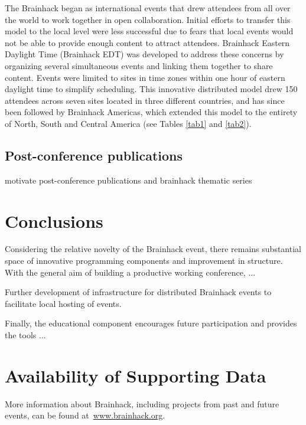 \documentclass[11pt]{bmc_article_s50}
\begin{document}
The Brainhack began as international events that drew attendees from all over the world to work together in open collaboration. Initial efforts to transfer this model to the local level were less successful due to fears that local events would not be able to provide enough content to attract attendees. Brainhack Eastern Daylight Time (Brainhack EDT) was developed to address these concerns by organizing several simultaneous events and linking them together to share content. Events were limited to sites in time zones within one hour of eastern daylight time to simplify scheduling. This innovative distributed model drew 150 attendees across seven sites located in three different countries, and has since been followed by Brainhack Americas, which extended this model to the entirety of North, South and Central America (see Tables \ref{tab1} and \ref{tab2}).

\subsection{Post-conference publications}

motivate post-conference publications and brainhack thematic series


\section{Conclusions}

Considering the relative novelty of the Brainhack event, there remains substantial space of innovative programming components and improvement in structure. With the general aim of building a productive working conference, ...

Further development of infrastructure for distributed Brainhack events to facilitate local hosting of events. 

Finally, the educational component encourages future participation and provides the tools ...



\newpage
\section*{Availability of Supporting Data}
More information about Brainhack, including projects from past and future events, can be found at~\href{http://www.brainhack.org}{www.brainhack.org}.
\end{document}
